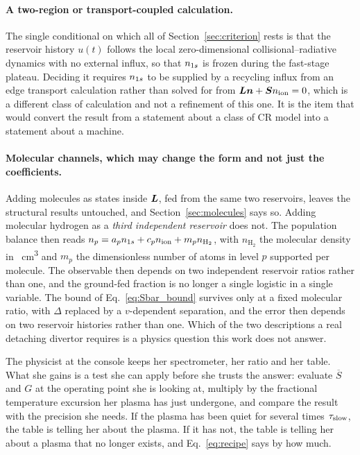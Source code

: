 \paragraph{A two-region or transport-coupled calculation.} The single conditional
on which all of Section~\ref{sec:criterion} rests is that the reservoir history
$u(t)$ follows the local zero-dimensional collisional--radiative dynamics with
no external influx, so that $n_{1s}$ is frozen during the fast-stage plateau.
Deciding it requires $n_{1s}$ to be supplied by a
recycling influx from an edge transport calculation rather than solved for from
$\bm{L}\bm{n} + \bm{S}n_{\mathrm{ion}} = 0$, which is a different class of calculation and
not a refinement of this one. It is the item that would convert the result from
a statement about a class of CR model into a statement about a machine.

\paragraph{Molecular channels, which may change the form and not just the
coefficients.}
Adding molecules as states inside $\bm{L}$, fed from the same two reservoirs,
leaves the structural results untouched, and Section~\ref{sec:molecules} says
so. Adding molecular hydrogen as a \emph{third independent reservoir} does not.
The population balance then reads
$n_p = a_pn_{1s} + c_pn_{\mathrm{ion}} + m_p n_{\mathrm{H_2}}$, with $n_{\mathrm{H_2}}$ the
molecular density in \si{\per\cubic\centi\metre} and $m_p$ the dimensionless
number of atoms in level $p$ supported per molecule. The observable then
depends on two independent reservoir ratios rather than one, and the ground-fed fraction is no longer a single logistic in a single
variable. The bound of Eq.~\eqref{eq:Sbar_bound} survives only at a fixed
molecular ratio, with $\Delta$ replaced by a $v$-dependent separation, and the
error then depends on two reservoir histories rather than one. Which of the two descriptions a real detaching divertor requires
is a physics question this work does not answer.

\medskip

The physicist at the console keeps her spectrometer, her ratio and her table.
What she gains is a test she can apply before she trusts the answer: evaluate
$\overline{S}$ and $G$ at the operating point she is looking at, multiply by the
fractional temperature excursion her plasma has just undergone, and compare the
result with the precision she needs. If the plasma has been quiet for several
times $\tau_{\mathrm{slow}}$, the table is telling her about the plasma. If it has not, the
table is telling her about a plasma that no longer exists, and
Eq.~\eqref{eq:recipe} says by how much.

